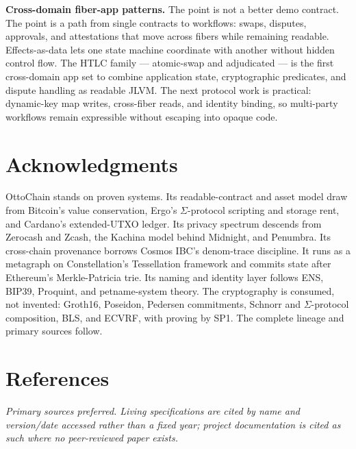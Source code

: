 \documentclass[11pt,a4paper]{article}
\begin{document}
\textbf{Cross-domain fiber-app patterns.} The point is not a better demo contract. The point is a path from single contracts to workflows: swaps, disputes, approvals, and attestations that move across fibers while remaining readable. Effects-as-data lets one state machine coordinate with another without hidden control flow. The HTLC family --- atomic-swap and adjudicated --- is the first cross-domain app set to combine application state, cryptographic predicates, and dispute handling as readable JLVM. The next protocol work is practical: dynamic-key map writes, cross-fiber reads, and identity binding, so multi-party workflows remain expressible without escaping into opaque code.

\section*{Acknowledgments}

OttoChain stands on proven systems. Its readable-contract and asset model draw from Bitcoin's value conservation, Ergo's $\Sigma$-protocol scripting and storage rent, and Cardano's extended-UTXO ledger. Its privacy spectrum descends from Zerocash and Zcash, the Kachina model behind Midnight, and Penumbra. Its cross-chain provenance borrows Cosmos IBC's denom-trace discipline. It runs as a metagraph on Constellation's Tessellation framework and commits state after Ethereum's Merkle-Patricia trie. Its naming and identity layer follows ENS, BIP39, Proquint, and petname-system theory. The cryptography is consumed, not invented: Groth16, Poseidon, Pedersen commitments, Schnorr and $\Sigma$-protocol composition, BLS, and ECVRF, with proving by SP1. The complete lineage and primary sources follow.

\section*{References}

\emph{Primary sources preferred. Living specifications are cited by name and version/date accessed rather than a fixed year; project documentation is cited as such where no peer-reviewed paper exists.}
\end{document}
